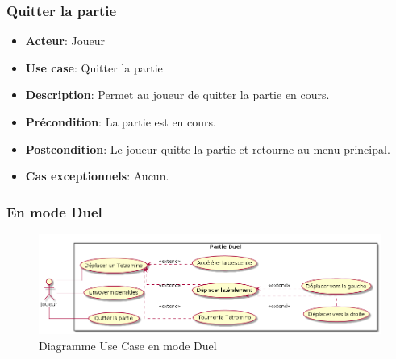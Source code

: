 \documentclass{article}
\begin{document}

\subsubsection*{Quitter la partie}
\begin{itemize}
    \item \textbf{Acteur}: Joueur
    \item \textbf{Use case}: Quitter la partie
    \item \textbf{Description}: Permet au joueur de quitter la partie en cours.
    \item \textbf{Précondition}: La partie est en cours.
    \item \textbf{Postcondition}: Le joueur quitte la partie et retourne au menu principal.
    \item \textbf{Cas exceptionnels}: Aucun.
\end{itemize}

\subsubsection{En mode Duel}

\begin{figure}[!h]
    \centering
    \includegraphics[width=1\textwidth]{../../res/uml/usecase/DualUseCase.png}
    \caption{Diagramme Use Case en mode Duel}
    \label{fig:Duel}
\end{figure}
\end{document}
